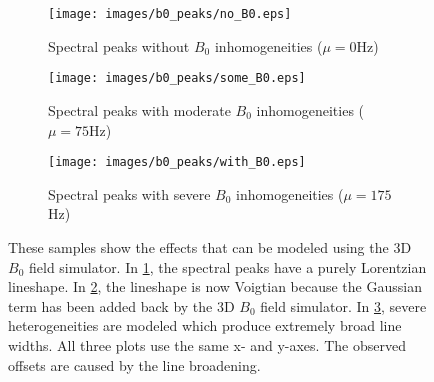 \documentclass[AMA,LATO1COL]{WileyNJD-v2}
\begin{document}
\begin{figure}
    \centering
    \begin{subfigure}{0.32\textwidth}
        \centering
        \texttt{[image: images/b0\_peaks/no\_B0.eps]}
        \caption{Spectral peaks without $B_0$ inhomogeneities ($\mu = 0$Hz)}
        \label{subfig:without B0}        
    \end{subfigure}
    \begin{subfigure}{0.32\textwidth}
        \centering
        \texttt{[image: images/b0\_peaks/some\_B0.eps]}
        \caption{Spectral peaks with moderate $B_0$ inhomogeneities ($\mu = 75$Hz)}
        \label{subfig:some B0}        
    \end{subfigure}
    \begin{subfigure}{0.32\textwidth}
        \centering
        \texttt{[image: images/b0\_peaks/with\_B0.eps]}
        \caption{Spectral peaks with severe $B_0$ inhomogeneities ($\mu = 175$Hz)}
        \label{subfig:with B0}        
    \end{subfigure}
    \caption{These samples show the effects that can be modeled using the 3D $B_0$ field simulator. In \ref{subfig:without B0}, the spectral peaks have a purely Lorentzian lineshape. In \ref{subfig:some B0}, the lineshape is now Voigtian because the Gaussian term has been added back by the 3D $B_0$ field simulator. In \ref{subfig:with B0}, severe heterogeneities are modeled which produce extremely broad line widths. All three plots use the same x- and y-axes. The observed offsets are caused by the line broadening.}
    \label{fig:B0 effects}
\end{figure}
\end{document}
